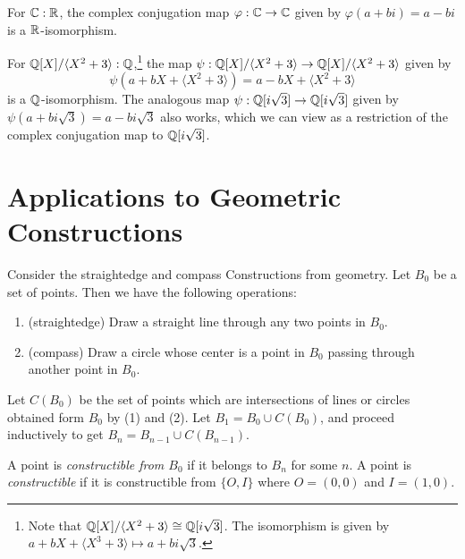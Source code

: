 \begin{example}
  For $\mathbb{C} : \mathbb{R}$, the complex conjugation map
  $\varphi : \mathbb{C} \to \mathbb{C}$ given by
  $\varphi(a + bi) = a - bi$ is a $\mathbb{R}$-isomorphism.
\end{example}

\begin{example}
  For $\mathbb{Q}[X] / \langle X^2 + 3 \rangle : \mathbb{Q}$,\footnote{Note that $\mathbb{Q}[X] / \langle X^2 + 3 \rangle \cong \mathbb{Q}[i\sqrt{3}]$. The isomorphism is given by $a + bX + \langle X^3 + 3 \rangle \mapsto a + bi\sqrt{3}$.}
  the map $\psi : \mathbb{Q}[X] / \langle X^2 + 3 \rangle \to \mathbb{Q}[X] / \langle X^2 + 3 \rangle$ given by
  \[
    \psi(a + bX + \langle X^2 + 3 \rangle) = a - bX + \langle X^2 + 3 \rangle
  \]
  is a $\mathbb{Q}$-isomorphism. The analogous
  map $\psi : \mathbb{Q}[i\sqrt{3}] \to \mathbb{Q}[i\sqrt{3}]$
  given by $\psi(a + bi\sqrt{3}) = a - bi\sqrt{3}$
  also works, which we can view as a restriction
  of the complex conjugation map to $\mathbb{Q}[i\sqrt{3}]$.
\end{example}

\section{Applications to Geometric Constructions}
Consider the straightedge and compass Constructions
from geometry. Let $B_0$ be a set of points. Then
we have the following operations:
\begin{enumerate}
  \item (straightedge) Draw a straight line through any
    two points in $B_0$.
  \item (compass) Draw a circle whose center is a
    point in $B_0$ passing through another point in $B_0$.
\end{enumerate}
Let $C(B_0)$ be the set of points which are intersections
of lines or circles obtained form $B_0$ by (1) and (2).
Let $B_1 = B_0 \cup C(B_0)$, and proceed
inductively to get $B_n = B_{n-1} \cup C(B_{n-1})$.

\begin{definition}
  A point is \emph{constructible from $B_0$} if it belongs
  to $B_n$ for some $n$. A point is \emph{constructible}
  if it is constructible from $\{O, I\}$ where
  $O = (0, 0)$ and $I = (1, 0)$.
\end{definition}

